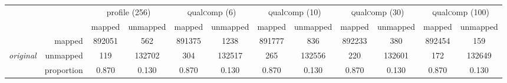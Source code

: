\documentclass[fleqn,10pt,lineno]{wlpeerj} %
\begin{document}
\begin{table*}[!tbhp]
\begin{tiny}
\begin{tabular}{lr|cc|cc|cc|cc|cc}
&  & \multicolumn{2}{c|}{profile (256)} & \multicolumn{2}{c|}{\textsc{q}ual\textsc{c}omp (6)} & \multicolumn{2}{c|}{\textsc{q}ual\textsc{c}omp (10)} & \multicolumn{2}{c|}{\textsc{q}ual\textsc{c}omp (30)} & \multicolumn{2}{c}{\textsc{q}ual\textsc{c}omp (100)} \\
& &  mapped & unmapped & mapped & unmapped & mapped & unmapped & mapped & unmapped & mapped & unmapped \\
\cline{2-12}
& mapped & 892051 & 562 & 891375 & 1238 & 891777 & 836 & 892233 & 380 & 892454 & 159 \\
{\em original}  & unmapped & 119 & 132702 & 304 & 132517 & 265 & 132556 & 220 & 132601 & 172 & 132649 \\
\cline{2-12}
& proportion & 0.870 & 0.130 & 0.870 & 0.130 & 0.870 & 0.130 & 0.870 & 0.130 & 0.870 & 0.130 \\
\end{tabular}
\end{tiny}

\label{tab:aligner}
\end{table*}
\end{document}
